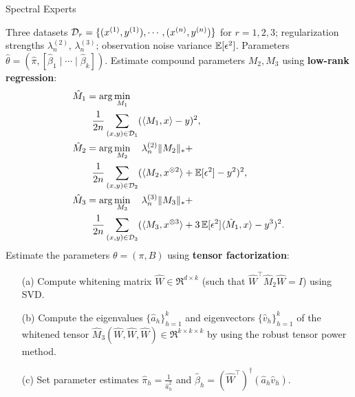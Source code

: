 \begin{algorithm}[t]
  \caption{Spectral Experts}
  \label{algo:spectral-experts}
  \begin{algorithmic}[1]
    \INPUT Three datasets $\mathcal{D}_r = \{ (x^{(1)}, y^{(1)}), \cdots, (x^{(n)}, y^{(n)}) \}$ for $r = 1, 2, 3$;
    regularization strengths $\lambda_n^{(2)}$, $\lambda_n^{(3)}$;
    observation noise variance $\operatorname{\mathbb{E}}[\epsilon^2]$.
    \OUTPUT Parameters $\hat\theta = (\hat \pi, [\hat \beta_1 \mid \cdots \mid \hat \beta_k])$.
    \STATE Estimate compound parameters $M_2, M_3$ using \textbf{low-rank regression}:
    \begin{align}
      &\hat M_1 = \arg\min_{M_1} \label{eqn:estimateM1} \\
      &\quad\quad\frac{1}{2n} \sum_{(x,y) \in \mathcal{D}_1} (\langle M_1, x \rangle - y)^2, \nonumber \\
      &\hat M_2 = \arg\min_{M_2} \quad \lambda_n^{(2)} \|M_2\|_* + \label{eqn:estimateM2} \\
      &\quad\quad\frac{1}{2n} \sum_{(x,y) \in \mathcal{D}_2} (\langle M_2, x^{\otimes 2} \rangle + \operatorname{\mathbb{E}}[\epsilon^2] - y^2)^2, \nonumber \\
      &\hat M_3 = \arg\min_{M_3} \quad \lambda_n^{(3)} \|M_3\|_* + \label{eqn:estimateM3} \\
      &\quad\quad\frac{1}{2n} \sum_{(x,y) \in \mathcal{D}_3} (\langle M_3, x^{\otimes 3} \rangle + 3 \operatorname{\mathbb{E}}[\epsilon^2]\langle \hat M_1, x \rangle - y^3)^2. \nonumber
    \end{align}
    \STATE Estimate the parameters $\theta = (\pi, B)$ using \textbf{tensor factorization}:
    \begin{enumerate}
      \item [(a)] Compute whitening matrix $\hat W \in \Re^{d \times k}$ (such that $\hat W^\top
      \hat M_2 \hat W = I$) using SVD.
      \item [(b)] Compute the eigenvalues $\{\hat a_h\}_{h=1}^k$
      and eigenvectors $\{\hat v_h\}_{h=1}^k$
      of the whitened tensor $\hat M_3(\hat W, \hat W, \hat W) \in \Re^{k \times k \times k}$
      by using the robust tensor power method.
    \item [(c)] Set parameter estimates $\hat\pi_h = \frac{1}{\hat a_h^2}$
    and $\hat\beta_h = (\hat W^{\top})^\dagger (\hat a_h \hat v_h)$.
    \end{enumerate}
  \end{algorithmic}
\end{algorithm}


